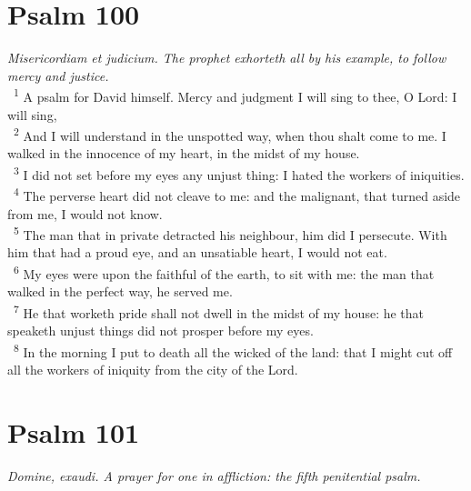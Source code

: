 \documentclass[a5paper,12pt]{article}
\begin{document}
\begin{multicols*}{2}
\section{Psalm 100}
\label{sec:orgc1d18f8}
\emph{Misericordiam et judicium. The prophet exhorteth all by his example, to follow mercy and justice.}\\

~\textsuperscript{1} A psalm for David himself. Mercy and judgment I will sing to thee, O Lord: I will sing,\\
~\textsuperscript{2} And I will understand in the unspotted way, when thou shalt come to me. I walked in the innocence of my heart, in the midst of my house.\\
~\textsuperscript{3} I did not set before my eyes any unjust thing: I hated the workers of iniquities.\\
~\textsuperscript{4} The perverse heart did not cleave to me: and the malignant, that turned aside from me, I would not know.\\
~\textsuperscript{5} The man that in private detracted his neighbour, him did I persecute. With him that had a proud eye, and an unsatiable heart, I would not eat.\\
~\textsuperscript{6} My eyes were upon the faithful of the earth, to sit with me: the man that walked in the perfect way, he served me.\\
~\textsuperscript{7} He that worketh pride shall not dwell in the midst of my house: he that speaketh unjust things did not prosper before my eyes.\\
~\textsuperscript{8} In the morning I put to death all the wicked of the land: that I might cut off all the workers of iniquity from the city of the Lord.\\

\section{Psalm 101}
\label{sec:orgb20270d}
\emph{Domine, exaudi. A prayer for one in affliction: the fifth penitential psalm.}\\


\end{multicols*}
\end{document}
